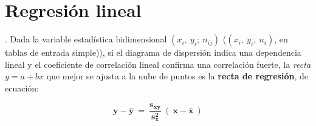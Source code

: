 	
\section{Regresión lineal}

\begin{theorem}
.	Dada la variable estadística bidimensional $(x_i, \ y_i; \ n_{ij})$ \textcolor{gris}{($(x_i,\ y_i,\ n_i) $, en tablas de entrada simple))}, si el diagrama de dispersión indica una dependencia lineal y el coeficiente de correlación lineal confirma una correlación fuerte, la \emph{recta} $y=a+bx$ que mejor se ajusta a la nube de puntos es la \textbf{recta de regresión}, de ecuación:

$$ \boxed{\ \  \boldsymbol{ y-\bar y \ =\  \dfrac {s_{xy}}{s_x^2}\  (\ x-\bar x\ ) }\ \  }$$
\end{theorem}

